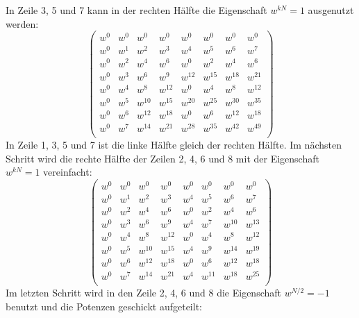 In Zeile 3, 5 und 7 kann in der rechten Hälfte die Eigenschaft $w^{kN} = 1$ ausgenutzt werden:
\begin{equation}
\left( \begin{array}{cccccccc}
w^{0} & w^{0} & w^{0} & w^{0} & w^{0} & w^{0} & w^{0} & w^{0}\\
w^{0} & w^{1} & w^{2} & w^{3} & w^{4} & w^{5} & w^{6} & w^{7}\\
w^{0} & w^{2} & w^{4} & w^{6} & w^{0} & w^{2} & w^{4} & w^{6}\\
w^{0} & w^{3} & w^{6} & w^{9} & w^{12} & w^{15} & w^{18} & w^{21}\\
w^{0} & w^{4} & w^{8} & w^{12} & w^{0} & w^{4} & w^{8} & w^{12}\\
w^{0} & w^{5} & w^{10} & w^{15} & w^{20} & w^{25} & w^{30} & w^{35}\\
w^{0} & w^{6} & w^{12} & w^{18} & w^{0} & w^{6} & w^{12} & w^{18}\\
w^{0} & w^{7} & w^{14} & w^{21} & w^{28} & w^{35} & w^{42} & w^{49}\\
\end{array} \right)
\end{equation}
In Zeile 1, 3, 5 und 7 ist die linke Hälfte gleich der rechten Hälfte.
Im nächsten Schritt wird die rechte Hälfte der Zeilen 2, 4, 6 und 8 mit der Eigenschaft $w^{kN} = 1$ vereinfacht:
\begin{equation*}
\left( \begin{array}{cccccccc}
w^{0} & w^{0} & w^{0} & w^{0} & w^{0} & w^{0} & w^{0} & w^{0}\\
w^{0} & w^{1} & w^{2} & w^{3} & w^{4} & w^{5} & w^{6} & w^{7}\\
w^{0} & w^{2} & w^{4} & w^{6} & w^{0} & w^{2} & w^{4} & w^{6}\\
w^{0} & w^{3} & w^{6} & w^{9} & w^{4} & w^{7} & w^{10} & w^{13}\\
w^{0} & w^{4} & w^{8} & w^{12} & w^{0} & w^{4} & w^{8} & w^{12}\\
w^{0} & w^{5} & w^{10} & w^{15} & w^{4} & w^{9} & w^{14} & w^{19}\\
w^{0} & w^{6} & w^{12} & w^{18} & w^{0} & w^{6} & w^{12} & w^{18}\\
w^{0} & w^{7} & w^{14} & w^{21} & w^{4} & w^{11} & w^{18} & w^{25}\\
\end{array} \right)
\end{equation*}
Im letzten Schritt wird in den Zeile 2, 4, 6 und 8 die Eigenschaft $w^{N/2} = -1$ benutzt und die Potenzen geschickt aufgeteilt:
